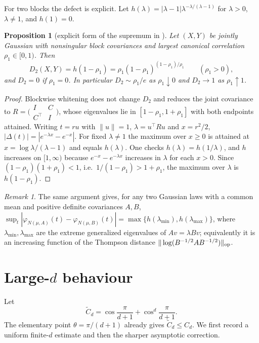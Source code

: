 \documentclass[11pt]{article}
\newtheorem{proposition}[theorem]{Proposition}
\theoremstyle{definition}\newtheorem{definition}[theorem]{Definition}
\theoremstyle{remark}\newtheorem{remark}[theorem]{Remark}
\begin{document}
For two blocks the defect is explicit. Let
$h(\lambda)=|\lambda-1|\lambda^{-\lambda/(\lambda-1)}$ for $\lambda>0$, $\lambda\ne1$, and $h(1)=0$.

\begin{proposition}[explicit form of the supremum in {\cite[Thm.~1(4)]{Daniusis2025}}]\label{prop:gauss-two}
Let $(X,Y)$ be jointly Gaussian with nonsingular block covariances and largest canonical correlation
$\rho_1\in[0,1)$. Then
\[
D_2(X,Y)=h(1-\rho_1)=\rho_1(1-\rho_1)^{(1-\rho_1)/\rho_1}\qquad(\rho_1>0),
\]
and $D_2=0$ if $\rho_1=0$. In particular $D_2\sim\rho_1/e$ as $\rho_1\downarrow0$ and $D_2\to1$ as
$\rho_1\uparrow1$.
\end{proposition}
\begin{proof}
Blockwise whitening does not change $D_2$ and reduces the joint covariance to
$R=\bigl(\begin{smallmatrix}I&C\\C^\top&I\end{smallmatrix}\bigr)$, whose eigenvalues lie in $[1-\rho_1,1+\rho_1]$
with both endpoints attained. Writing $t=ru$ with $\|u\|=1$, $\lambda=u^\top Ru$ and $x=r^2/2$,
$|\Delta(t)|=|e^{-\lambda x}-e^{-x}|$. For fixed $\lambda\ne1$ the maximum over $x\ge0$ is attained at
$x=\log\lambda/(\lambda-1)$ and equals $h(\lambda)$. One checks $h(\lambda)=h(1/\lambda)$, and $h$ increases on
$[1,\infty)$ because $e^{-x}-e^{-\lambda x}$ increases in $\lambda$ for each $x>0$. Since
$(1-\rho_1)(1+\rho_1)<1$, i.e.\ $1/(1-\rho_1)>1+\rho_1$, the maximum over $\lambda$ is $h(1-\rho_1)$.
\end{proof}

\begin{remark}
The same argument gives, for any two Gaussian laws with a common mean and positive definite covariances $A,B$,
$\sup_t|\varphi_{N(\mu,A)}(t)-\varphi_{N(\mu,B)}(t)|=\max\{h(\lambda_{\min}),h(\lambda_{\max})\}$, where
$\lambda_{\min},\lambda_{\max}$ are the extreme generalized eigenvalues of $Av=\lambda Bv$; equivalently it is an
increasing function of the Thompson distance $\|\log(B^{-1/2}AB^{-1/2})\|_{\rm op}$.
\end{remark}



\section{Large-\texorpdfstring{$d$}{d} behaviour}\label{sec:larged}
Let
\[
\widetilde C_d=\cos\frac{\pi}{d+1}+\cos^d\frac{\pi}{d+1}.
\]
The elementary point $\theta=\pi/(d+1)$ already gives $\widetilde C_d\le C_d$. We first record a
uniform finite-$d$ estimate and then the sharper asymptotic correction.
\end{document}
